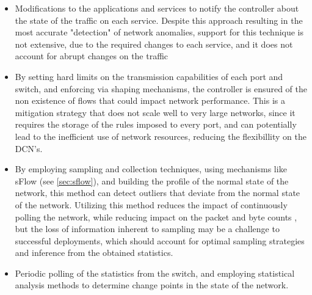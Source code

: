 \begin {itemize}
    \item Modifications to the applications and services to notify the controller about the state of the traffic on each service. Despite this approach resulting
         in the most accurate "detection" of network anomalies, support for this technique is not extensive, due to the required changes to each service, 
         and it does not account for abrupt changes on the traffic
    \item By setting hard limits on the transmission capabilities of each port and switch, and enforcing via shaping mechanisms, the controller is ensured of the 
        non existence of flows that could impact network performance. This is a mitigation strategy that does not scale well to very large networks, since it 
        requires the storage of the rules imposed to every port, and can potentially lead to the inefficient use of network resources, reducing the flexibillity on
        the DCN's.
    \item By employing sampling and collection techniques, using mechanisms like sFlow (see \ref{sec:sflow}), and building the profile of the normal state of 
        the network, this method can detect outliers that deviate from the normal state of the network. Utilizing this method reduces the impact of continuously 
        polling the network, while reducing impact on the packet and byte counts \cite{brauckhoff_impact_2006}, but the loss of information inherent to
        sampling may be a challenge to successful deployments, which should account for optimal sampling strategies and inference from the obtained statistics.
    \item Periodic polling of the statistics from the switch, and employing statistical analysis methods to determine change points in the state of the network.
\end {itemize}

